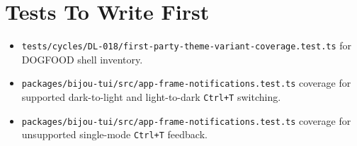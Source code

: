 

\section{Tests To Write First}\label{record-183-tests-to-write-first}

\begin{itemize}
\tightlist
\item
  \texttt{t\allowbreak{}e\allowbreak{}s\allowbreak{}t\allowbreak{}s\allowbreak{}/\allowbreak{}c\allowbreak{}y\allowbreak{}c\allowbreak{}l\allowbreak{}e\allowbreak{}s\allowbreak{}/\allowbreak{}D\allowbreak{}L\allowbreak{}-\allowbreak{}0\allowbreak{}1\allowbreak{}8\allowbreak{}/\allowbreak{}f\allowbreak{}i\allowbreak{}r\allowbreak{}s\allowbreak{}t\allowbreak{}-\allowbreak{}p\allowbreak{}a\allowbreak{}r\allowbreak{}t\allowbreak{}y\allowbreak{}-\allowbreak{}t\allowbreak{}h\allowbreak{}e\allowbreak{}m\allowbreak{}e\allowbreak{}-\allowbreak{}v\allowbreak{}a\allowbreak{}r\allowbreak{}i\allowbreak{}a\allowbreak{}n\allowbreak{}t\allowbreak{}-\allowbreak{}c\allowbreak{}o\allowbreak{}v\allowbreak{}e\allowbreak{}r\allowbreak{}a\allowbreak{}g\allowbreak{}e\allowbreak{}.\allowbreak{}t\allowbreak{}e\allowbreak{}s\allowbreak{}t\allowbreak{}.\allowbreak{}t\allowbreak{}s} for DOGFOOD shell inventory.
\item
  \texttt{p\allowbreak{}a\allowbreak{}c\allowbreak{}k\allowbreak{}a\allowbreak{}g\allowbreak{}e\allowbreak{}s\allowbreak{}/\allowbreak{}b\allowbreak{}i\allowbreak{}j\allowbreak{}o\allowbreak{}u\allowbreak{}-\allowbreak{}t\allowbreak{}u\allowbreak{}i\allowbreak{}/\allowbreak{}s\allowbreak{}r\allowbreak{}c\allowbreak{}/\allowbreak{}a\allowbreak{}p\allowbreak{}p\allowbreak{}-\allowbreak{}f\allowbreak{}r\allowbreak{}a\allowbreak{}m\allowbreak{}e\allowbreak{}-\allowbreak{}n\allowbreak{}o\allowbreak{}t\allowbreak{}i\allowbreak{}f\allowbreak{}i\allowbreak{}c\allowbreak{}a\allowbreak{}t\allowbreak{}i\allowbreak{}o\allowbreak{}n\allowbreak{}s\allowbreak{}.\allowbreak{}t\allowbreak{}e\allowbreak{}s\allowbreak{}t\allowbreak{}.\allowbreak{}t\allowbreak{}s} coverage for supported dark-to-light and light-to-dark \texttt{C\allowbreak{}t\allowbreak{}r\allowbreak{}l\allowbreak{}+\allowbreak{}T} switching.
\item
  \texttt{p\allowbreak{}a\allowbreak{}c\allowbreak{}k\allowbreak{}a\allowbreak{}g\allowbreak{}e\allowbreak{}s\allowbreak{}/\allowbreak{}b\allowbreak{}i\allowbreak{}j\allowbreak{}o\allowbreak{}u\allowbreak{}-\allowbreak{}t\allowbreak{}u\allowbreak{}i\allowbreak{}/\allowbreak{}s\allowbreak{}r\allowbreak{}c\allowbreak{}/\allowbreak{}a\allowbreak{}p\allowbreak{}p\allowbreak{}-\allowbreak{}f\allowbreak{}r\allowbreak{}a\allowbreak{}m\allowbreak{}e\allowbreak{}-\allowbreak{}n\allowbreak{}o\allowbreak{}t\allowbreak{}i\allowbreak{}f\allowbreak{}i\allowbreak{}c\allowbreak{}a\allowbreak{}t\allowbreak{}i\allowbreak{}o\allowbreak{}n\allowbreak{}s\allowbreak{}.\allowbreak{}t\allowbreak{}e\allowbreak{}s\allowbreak{}t\allowbreak{}.\allowbreak{}t\allowbreak{}s} coverage for unsupported single-mode \texttt{C\allowbreak{}t\allowbreak{}r\allowbreak{}l\allowbreak{}+\allowbreak{}T} feedback.

\end{itemize}

